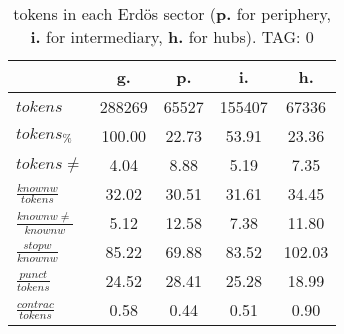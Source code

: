 \begin{table}[h!]
\begin{center}
\begin{tabular}{| l || c | c | c | c |}\hline
 & {\bf g.} & {\bf p.} & {\bf i.} & {\bf h.} \\\hline\hline
$tokens$ & 288269  & 65527  & 155407  & 67336 \\
$tokens_{\%}$ & 100.00  & 22.73  & 53.91  & 23.36 \\
$tokens \neq$ & 4.04  & 8.88  & 5.19  & 7.35 \\\hline
$\frac{knownw}{tokens}$ & 32.02  & 30.51  & 31.61  & 34.45 \\
$\frac{knownw \neq}{knownw}$ & 5.12  & 12.58  & 7.38  & 11.80 \\\hline
$\frac{stopw}{knownw}$ & 85.22  & 69.88  & 83.52  & 102.03 \\
$\frac{punct}{tokens}$ & 24.52  & 28.41  & 25.28  & 18.99 \\
$\frac{contrac}{tokens}$ & 0.58  & 0.44  & 0.51  & 0.90 \\\hline
\end{tabular}
\caption{tokens in each Erd\"os sector ({{\bf p.}} for periphery, {{\bf i.}} for intermediary, 
    {{\bf h.}} for hubs). TAG: 0}
\end{center}
\end{table}